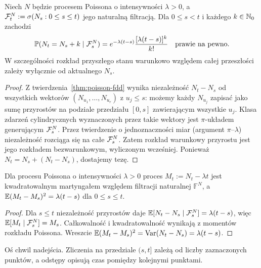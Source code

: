 \begin{twierdzenie}
Niech $N$ będzie procesem Poissona o intensywności $\lambda>0$,
a $\mathcal{F}_t^N:=\sigma(N_s:0\le s\le t)$ jego naturalną
filtracją. Dla $0\le s<t$ i każdego $k\in\mathbb{N}_0$ zachodzi
\[
\mathbb{P}(N_t=N_s+k\mid\mathcal{F}_s^N)
=e^{-\lambda(t-s)}\frac{[\lambda(t-s)]^k}{k!}
\quad\text{prawie na pewno}.
\]
W szczególności rozkład przyszłego stanu warunkowo względem
całej przeszłości zależy wyłącznie od aktualnego $N_s$.
\end{twierdzenie}
\begin{proof}
Z twierdzenia~\ref{thm:poisson-fdd} wynika niezależność
$N_t-N_s$ od wszystkich wektorów
$(N_{u_1},\ldots,N_{u_r})$ z $u_j\le s$:
możemy każdy $N_{u_j}$ zapisać jako sumę przyrostów na podziale
przedziału $[0,s]$ zawierającym wszystkie $u_j$.
Klasa zdarzeń cylindrycznych wyznaczonych przez takie wektory
jest $\pi$-układem generującym $\mathcal{F}_s^N$.
Przez twierdzenie o jednoznaczności miar (argument
$\pi$--$\lambda$) niezależność rozciąga się na całe
$\mathcal{F}_s^N$. Zatem rozkład warunkowy przyrostu jest jego
rozkładem bezwarunkowym, wyliczonym wcześniej.
Ponieważ $N_t=N_s+(N_t-N_s)$, dostajemy tezę.
\end{proof}

\begin{wniosek}
Dla procesu Poissona o intensywności $\lambda>0$ proces
$M_t:=N_t-\lambda t$ jest kwadratowalnym martyngałem względem
filtracji naturalnej $\mathbb F^N$, a
$\mathbb{E}(M_t-M_s)^2=\lambda(t-s)$ dla $0\le s\le t$.
\end{wniosek}
\begin{proof}
Dla $s\le t$ niezależność przyrostów daje
$\mathbb{E}[N_t-N_s\mid\mathcal{F}_s^N]=\lambda(t-s)$,
więc $\mathbb{E}[M_t\mid\mathcal{F}_s^N]=M_s$.
Całkowalność i kwadratowalność wynikają z momentów
rozkładu Poissona. Wreszcie
$\mathbb{E}(M_t-M_s)^2=\operatorname{Var}(N_t-N_s)=\lambda(t-s)$.
\end{proof}


\begin{center}
\par\smallskip\small Oś chwil nadejścia. Zliczenia na przedziale $(s,t]$
 zależą od liczby zaznaczonych punktów, a odstępy opisują
 czas pomiędzy kolejnymi punktami.
\end{center}

